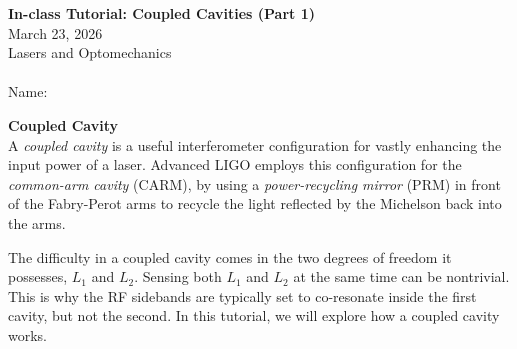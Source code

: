 \documentclass[11pt]{article}
\begin{document}
\begin{center}
    \textbf{In-class Tutorial: Coupled Cavities (Part 1)}\\
    March 23, 2026\\
    Lasers and Optomechanics\\~\\
    Name: \underline{\hspace{10cm}}
\end{center}


\noindent
\textbf{Coupled Cavity}\\
A \textit{coupled cavity} is a useful interferometer configuration for vastly enhancing the input power of a laser.
Advanced LIGO employs this configuration for the \textit{common-arm cavity} (CARM), 
by using a \textit{power-recycling mirror} (PRM) in front of the Fabry-Perot arms 
to recycle the light reflected by the Michelson back into the arms.

The difficulty in a coupled cavity comes in the two degrees of freedom it possesses, $L_1$ and $L_2$.
Sensing both $L_1$ and $L_2$ at the same time can be nontrivial.
This is why the RF sidebands are typically set to co-resonate inside the first cavity, but not the second.
In this tutorial, we will explore how a coupled cavity works.
\end{document}
